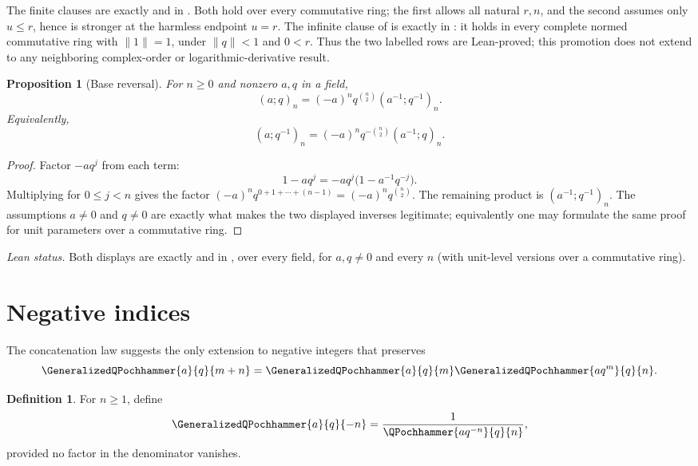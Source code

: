 \documentclass[11pt,a4paper,oneside,openany]{book}
\newtheorem{proposition}[proposition]{Proposition}
\theoremstyle{definition}
\newtheorem{definition}[definition]{Definition}
\theoremstyle{remark}
\begin{document}
The finite clauses are exactly
 and
 in
.  Both hold over every commutative ring; the
first allows all natural $r,n$, and the second assumes only $u\le r$, hence is
stronger at the harmless endpoint $u=r$.  The infinite clause of
 is exactly
 in
: it holds in every complete normed
commutative ring with $\lVert1\rVert=1$, under $\lVert q\rVert<1$ and
$0<r$.  Thus the two labelled rows are Lean-proved; this promotion does not
extend to any neighboring complex-order or logarithmic-derivative result.

\begin{proposition}[Base reversal]\label{prop:base-reversal}
For $n\ge0$ and nonzero $a,q$ in a field,
\[
 (a;q)_n=(-a)^n q^{\binom n2}(a^{-1};q^{-1})_n.
\]
Equivalently,
\[
 (a;q^{-1})_n=(-a)^nq^{-\binom n2}(a^{-1};q)_n.
\]
\end{proposition}

\begin{proof}
Factor $-aq^j$ from each term:
\[
 1-aq^j=-aq^j\bigl(1-a^{-1}q^{-j}\bigr).
\]
Multiplying for $0\le j<n$ gives the factor
\(
 (-a)^nq^{0+1+\cdots+(n-1)}=(-a)^nq^{\binom n2}.
\)
The remaining product is $(a^{-1};q^{-1})_n$.  The assumptions
$a\ne0$ and $q\ne0$ are exactly what makes the two displayed inverses
legitimate; equivalently one may formulate the same proof for unit parameters
over a commutative ring.
\end{proof}

\emph{Lean status.}  Both displays are exactly
 and
 in
, over every field, for $a,q\ne0$ and every
$n$ (with unit-level versions  over a
commutative ring).


\section{Negative indices}

The concatenation law suggests the only extension to negative integers that preserves
\[
 \GeneralizedQPochhammer{a}{q}{m+n}
 =\GeneralizedQPochhammer{a}{q}{m}
  \GeneralizedQPochhammer{aq^m}{q}{n}.
\]

\begin{definition}\label{qg:def-negative-qshifted-index}
For $n\ge1$, define
\[
 \GeneralizedQPochhammer{a}{q}{-n}
 =\frac{1}{\QPochhammer{aq^{-n}}{q}{n}},
\]
provided no factor in the denominator vanishes.
\end{definition}
\end{document}
